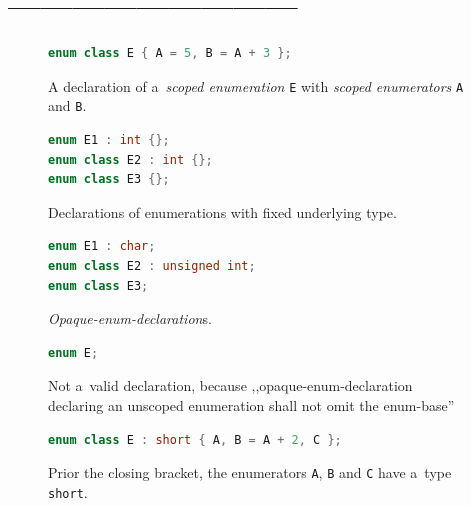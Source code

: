\documentclass{fithesis3}
\newcommand{\theStandard}[1]{\cite[\S 7.2:2]{n4296}\xspace}
\begin{document}

\section{---------------------------}


\begin{figure}
\begin{lstlisting}[language=C++]
enum class E { A = 5, B = A + 3 };
\end{lstlisting}
\caption{A declaration of a~\textit{scoped enumeration} \texttt{E} with \textit{scoped enumerators} \texttt{A} and \texttt{B}.}
\end{figure}

\begin{figure}
\begin{lstlisting}[language=C++]
enum E1 : int {};
enum class E2 : int {};
enum class E3 {};
\end{lstlisting}
\caption{Declarations of enumerations with fixed underlying type.}
\end{figure}

\begin{figure}
\begin{lstlisting}[language=C++]
enum E1 : char;
enum class E2 : unsigned int;
enum class E3;
\end{lstlisting}
\caption{\textit{Opaque-enum-declaration}s.}
\end{figure}

\begin{figure}
\begin{lstlisting}[language=C++]
enum E;
\end{lstlisting}
\caption{Not a~valid declaration, because ,,opaque-enum-declaration declaring an unscoped enumeration shall not omit the enum-base''~\theStandard{7.2:2}}
\end{figure}

\begin{figure}
\begin{lstlisting}[language=C++]
enum class E : short { A, B = A + 2, C };
\end{lstlisting}
\caption{Prior the closing bracket, the enumerators \texttt{A}, \texttt{B} and \texttt{C} have a~type \texttt{short}.}
\end{figure}
\end{document}
